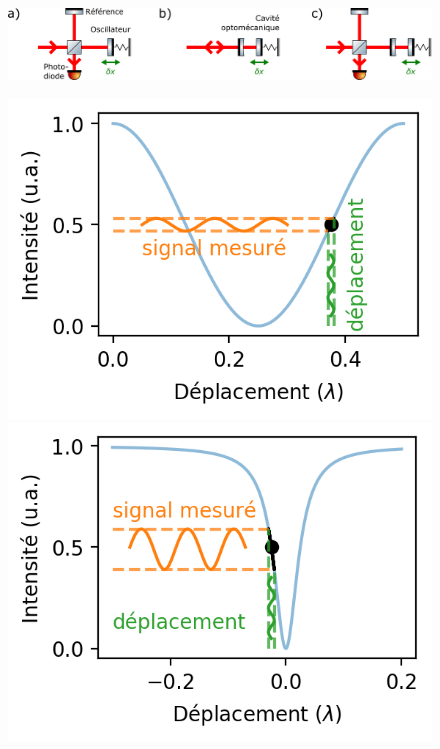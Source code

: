\documentclass[12pt,a4paper]{article}
\begin{document}
\begin{figure}
\center
\includegraphics[scale=0.8]{figures/detection_scheme.png}

\includegraphics[scale=0.75]{figures/michelson_response.png}
\includegraphics[scale=0.75]{figures/cavity_intensity_response.png}

\end{figure}
\end{document}

